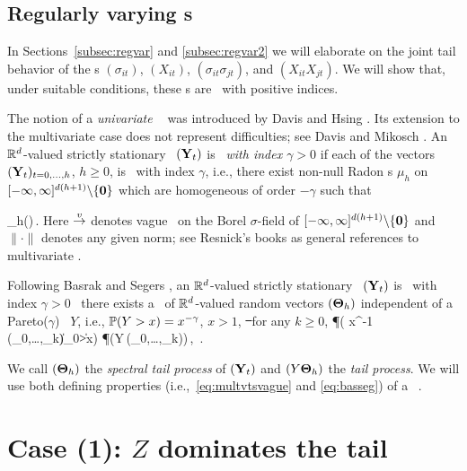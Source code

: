 \subsection{Regularly varying \seq s}\label{subsec:rvts}
In Sections~\ref{subsec:regvar} and \ref{subsec:regvar2} 
we will elaborate on the joint tail behavior of the \seq s
$(\sigma_{it})$, $(X_{it})$, $(\sigma_{it}\sigma_{jt})$, 
and $(X_{it}X_{jt})$. We will show that, under suitable conditions,
these \seq s are \regvary\ with positive indices. 

The notion of a {\em univariate \regvary\ \seq } was introduced by
Davis and Hsing \cite{davis:hsing:1995}. 
Its extension to the multivariate case does not represent
difficulties; see Davis and Mikosch \cite{davis:mikosch:2009b}.
An $\bbr^d$-valued strictly stationary \seq\ $(\bfY_t)$ is {\em
  \regvary\ with index $\gamma>0$} if each of the vectors 
$(\bfY_t)_{t=0,\ldots,h}$, $h\ge 0$, is \regvary\ with index $\gamma$,
i.e., there exist non-null Radon s $\mu_h$ on 
$[-\infty,\infty]^{d(h+1)}\backslash\{\bf0\}$ which are homogeneous of
order $-\gamma$ such that

\beam \label{eq:multvtsvague}
 \stv \mu_h(\cdot)\,.
\eeam
Here $\stv$ denotes vague \con\ on the Borel $\sigma$-field of
$[-\infty,\infty]^{d(h+1)}\backslash\{\bf0\}$ and $\|\cdot\|$ denotes
any given norm; see Resnick's books \cite{resnick:1987,resnick:2007}
as general references to multivariate \regvar.

Following Basrak and Segers \cite{basrak:segers:2009}, 
an $\bbr^d$-valued strictly stationary \seq\ $(\bfY_t)$ is \regvary\
with index $\gamma>0$ \fif\ there exists a \seq\ of $\bbr^d$-valued
random vectors $(\bfTh_h)$ independent of a Pareto($\gamma$) \rv\ 
$Y$, i.e., $\P(Y>x)=x^{-\gamma}$, $x>1$,  \st\ for any $k\ge 0$, 
\beam\label{eq:basseg}
\P( x^{-1} (\bfY_0,\ldots,\bfY_k)\in \cdot \mid \|\bfY_0\|>x)\stw
\P\big(Y\,(\bfTh_0,\ldots,\bfTh_k)\in\cdot\big)\,,\qquad
\xto\,.
\eeam

We call $(\bfTh_h)$ the {\em spectral tail process} of $(\bfY_t)$ and
$(Y \bfTh_h)$ the {\em tail process}. We will use both defining
properties (i.e.,\ \eqref{eq:multvtsvague} and \eqref{eq:basseg}) of a
\regvary\ \seq.


\section{Case (1): $Z$ dominates the tail}\label{sec:case1}
